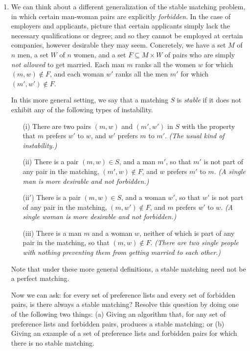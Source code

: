 \documentclass[12pt]{article}
\begin{document}
\begin{enumerate}

\item 

We can think about a
different generalization of the stable matching problem, in
which certain man-woman pairs are explicitly {\em forbidden}.
In the case of employers and applicants, picture that certain
applicants simply lack the necessary qualifications or degree;
and so they cannot be employed at certain companies,
however desirable they may seem.
Concretely, we have a set $M$ of $n$ men, a set $W$
of $n$ women, and a set $F \subseteq M \times W$
of pairs who are simply {\em not allowed} to get married.
Each man $m$ ranks all the women $w$ for which $(m,w) \not\in F$,
and each woman $w'$ ranks all the men $m'$ for which $(m',w') \not\in F$.

In this more general setting, we say that a matching $S$ is {\em stable}
if it does not exhibit any of the following types of instability.
\begin{itemize}
\item[(i)] There are two pairs $(m,w)$ and $(m',w')$ in $S$
with the property that $m$ prefers $w'$ to $w$,
and $w'$ prefers $m$ to $m'$.
{\em (The usual kind of instability.)}
\item[(ii)] There is a pair $(m,w) \in S$, and a man $m'$,
so that $m'$ is not part of any pair in the matching,
$(m',w) \not\in F$, and $w$ prefers $m'$ to $m$.
{\em (A single man is more desirable and not forbidden.)}
\item[(ii$'$)] There is a pair $(m,w) \in S$, and a woman $w'$,
so that $w'$ is not part of any pair in the matching,
$(m,w') \not\in F$, and $m$ prefers $w'$ to $w$.
{\em (A single woman is more desirable and not forbidden.)}
\item[(iii)] There is a man $m$ and a woman $w$,
neither of which is part of any pair in the matching,
so that $(m,w) \not\in F$.
{\em (There are two single people with nothing preventing
them from getting married to each other.)}
\end{itemize}
Note that under these more general definitions, a stable matching
need not be a perfect matching.

Now we can ask:
for every set of preference lists and every set of forbidden pairs,
is there always a stable matching?
Resolve this question by doing one of the following two things:
(a) Giving an algorithm that, for any set of
preference lists and forbidden pairs,
produces a stable matching;
or (b) Giving an example of a set of preference lists and forbidden pairs
for which there is no stable matching.


\end{enumerate}
\end{document}
